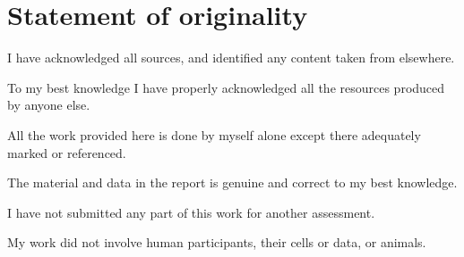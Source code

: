 

\section{Statement of originality}

I have acknowledged all sources, and identified any content taken from elsewhere.

To my best knowledge I have properly acknowledged all the resources produced by anyone else.

All the work provided here is done by myself alone except there adequately marked or referenced.

The material and data in the report is genuine and correct to my best knowledge.

I have not submitted any part of this work for another assessment.

My work did not involve human participants, their cells or data, or animals.